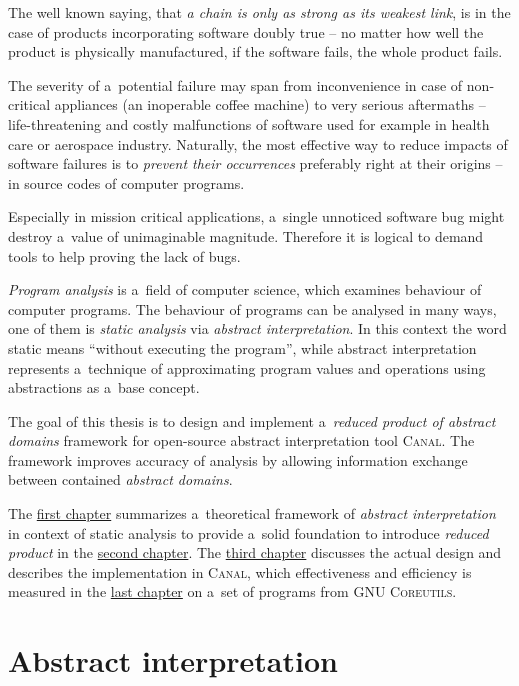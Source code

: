 \documentclass[12pt,oneside]{fithesis2}
\theoremstyle{definition}
\begin{document}
The well known saying, that \textit{a chain is only as strong as its weakest link}, is in the case of products incorporating software doubly true -- no matter how well the product is physically manufactured, if the software fails, the whole product fails.

The severity of a~potential failure may span from inconvenience in case of non-critical appliances (an inoperable coffee machine) to very serious aftermaths -- life-threatening and costly malfunctions of software used for example in health care or aerospace industry. Naturally, the most effective way to reduce impacts of software failures is to \textit{prevent their occurrences} preferably right at their origins -- in source codes of computer programs.

Especially in mission critical applications, a~single unnoticed software bug might destroy a~value of unimaginable magnitude. Therefore it is logical to demand tools to help proving the lack of bugs.

\textit{Program analysis} is a~field of computer science, which examines behaviour of computer programs. The behaviour of programs can be analysed in many ways, one of them is \textit{static analysis} via \textit{abstract interpretation}. In this context the word static means ``without executing the program'', while abstract interpretation represents a~technique of approximating program values and operations using abstractions as a~base concept.

The goal of this thesis is to design and implement a~\textit{reduced product of abstract domains} framework for open-source abstract interpretation tool \textsc{Canal}. The framework improves accuracy of analysis by allowing information exchange between contained \textit{abstract domains}.

The \hyperref[ch:abstract-interpretation]{first chapter} summarizes a~theoretical framework of \textit{abstract interpretation} in context of static analysis to provide a~solid foundation to introduce \textit{reduced product} in the \hyperref[ch:reduced-product]{second chapter}. The \hyperref[ch:implementation]{third chapter} discusses the actual design and describes the implementation in \textsc{Canal}, which effectiveness and efficiency is measured in the \hyperref[ch:measurements]{last chapter} on a~set of programs from \textsc{GNU Coreutils}.

\chapter{Abstract interpretation}\label{ch:abstract-interpretation}
\end{document}
